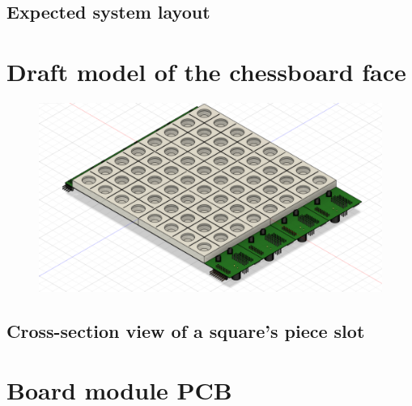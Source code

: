 \documentclass{article}
\begin{document}
\begin{appendices}
	\begin{landscape}
		\section{Expected system layout}
		\begin{figure}[H]
			
		\end{figure}
	\end{landscape}

	\section{Draft model of the chessboard face}

	\begin{figure}[H]
		\includegraphics[width=\textwidth]{appendix/board.png}
	\end{figure}

	\begin{landscape}
		\section{Cross-section view of a square's piece slot}

		\begin{figure}[H]
			
		\end{figure}
	\end{landscape}

	\section{Board module PCB}


\end{appendices}
\end{document}
